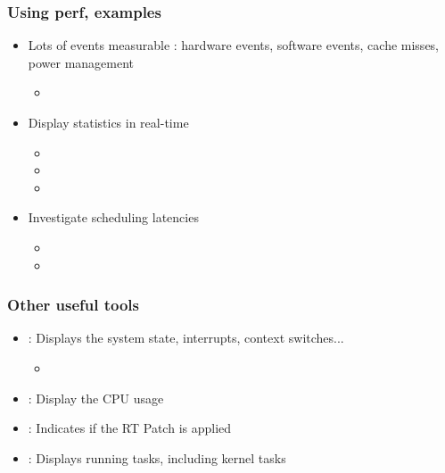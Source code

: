 \begin{frame}
	\frametitle{Using perf, examples}
	\begin{itemize}
		\item Lots of events measurable : hardware events, software events, cache misses, power management
			\begin{itemize}
				\item {}
			\end{itemize}
		\item Display statistics in real-time
			\begin{itemize}
				\item {}
				\item {}
				\item {}
			\end{itemize}
		\item Investigate scheduling latencies
			\begin{itemize}
				\item {}
				\item {}
			\end{itemize}
	\end{itemize}
\end{frame}

\begin{frame}
	\frametitle{Other useful tools}
	\begin{itemize}
		\item {} : Displays the system state, interrupts, context switches...
			\begin{itemize}
				\item {}
			\end{itemize}
		\item {} : Display the CPU usage
		\item {} : Indicates if the RT Patch is applied
		\item {} : Displays running tasks, including kernel tasks
	\end{itemize}
\end{frame}

